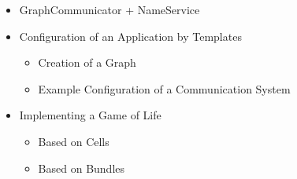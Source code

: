 \begin{itemize}
\item GraphCommunicator + NameService  

\item Configuration of an Application by Templates
  
  
  \begin{itemize}
  \item Creation of a Graph
  \item Example Configuration of a Communication System
  \end{itemize}

\item Implementing a Game of Life
  \begin{itemize}
  \item Based on Cells
  \item Based on Bundles
  \end{itemize}

\end{itemize}




\cleardoublepage

